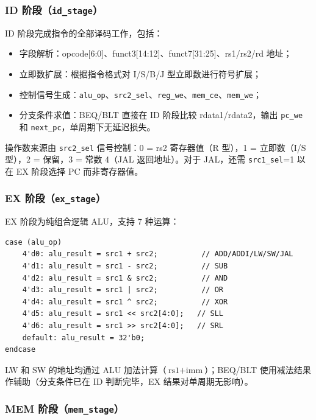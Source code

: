 \documentclass[12pt,hyperref,a4paper,UTF8]{ctexart}
\begin{document}
\subsubsection{ID 阶段（\texttt{id\_stage}）}

ID 阶段完成指令的全部译码工作，包括：
\begin{itemize}[leftmargin=2em]
    \item 字段解析：opcode[6:0]、funct3[14:12]、funct7[31:25]、rs1/rs2/rd 地址；
    \item 立即数扩展：根据指令格式对 I/S/B/J 型立即数进行符号扩展；
    \item 控制信号生成：\texttt{alu\_op}、\texttt{src2\_sel}、\texttt{reg\_we}、\texttt{mem\_ce}、\texttt{mem\_we}；
    \item 分支条件求值：BEQ/BLT 直接在 ID 阶段比较 rdata1/rdata2，输出 \texttt{pc\_we} 和 \texttt{next\_pc}，单周期下无延迟损失。
\end{itemize}

操作数来源由 \texttt{src2\_sel} 信号控制：0 = rs2 寄存器值（R 型），1 = 立即数（I/S 型），2 = 保留，3 = 常数 4（JAL 返回地址）。对于 JAL，还需 \texttt{src1\_sel}=1 以在 EX 阶段选择 PC 而非寄存器值。

\subsubsection{EX 阶段（\texttt{ex\_stage}）}

EX 阶段为纯组合逻辑 ALU，支持 7 种运算：

\begin{lstlisting}[caption={ALU 运算实现}]
case (alu_op)
    4'd0: alu_result = src1 + src2;          // ADD/ADDI/LW/SW/JAL
    4'd1: alu_result = src1 - src2;          // SUB
    4'd2: alu_result = src1 & src2;          // AND
    4'd3: alu_result = src1 | src2;          // OR
    4'd4: alu_result = src1 ^ src2;          // XOR
    4'd5: alu_result = src1 << src2[4:0];   // SLL
    4'd6: alu_result = src1 >> src2[4:0];   // SRL
    default: alu_result = 32'b0;
endcase
\end{lstlisting}

LW 和 SW 的地址均通过 ALU 加法计算（$\text{rs1} + \text{imm}$）；BEQ/BLT 使用减法结果作辅助（分支条件已在 ID 判断完毕，EX 结果对单周期无影响）。

\subsubsection{MEM 阶段（\texttt{mem\_stage}）}
\end{document}
